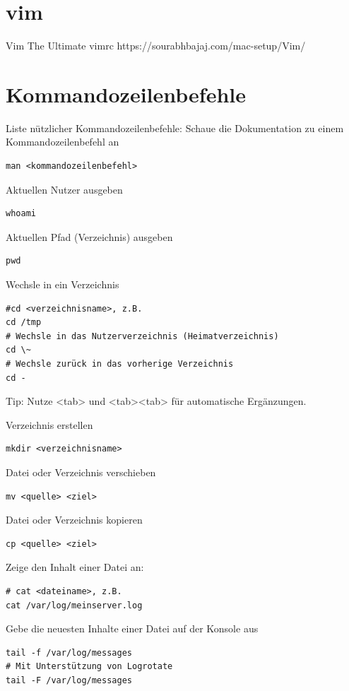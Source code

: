 \documentclass[]{article}
\begin{document}
\section{vim}
Vim
The Ultimate vimrc
https://sourabhbajaj.com/mac-setup/Vim/
\section{Kommandozeilenbefehle}
Liste nützlicher Kommandozeilenbefehle:
Schaue die Dokumentation zu einem Kommandozeilenbefehl an
\begin{verbatim}
man <kommandozeilenbefehl>
\end{verbatim}

Aktuellen Nutzer ausgeben
\begin{verbatim}
whoami
\end{verbatim}

Aktuellen Pfad (Verzeichnis) ausgeben
\begin{verbatim}
pwd
\end{verbatim}

Wechsle in ein Verzeichnis
\begin{verbatim}
#cd <verzeichnisname>, z.B.
cd /tmp
# Wechsle in das Nutzerverzeichnis (Heimatverzeichnis)
cd \~
# Wechsle zurück in das vorherige Verzeichnis
cd -
\end{verbatim}

Tip: Nutze <tab> und <tab><tab> für automatische Ergänzungen.

Verzeichnis erstellen
\begin{verbatim}
mkdir <verzeichnisname>
\end{verbatim}

Datei oder Verzeichnis verschieben
\begin{verbatim}
mv <quelle> <ziel>
\end{verbatim}

Datei oder Verzeichnis kopieren
\begin{verbatim}
cp <quelle> <ziel>
\end{verbatim}

Zeige den Inhalt einer Datei an:
\begin{verbatim}
# cat <dateiname>, z.B.
cat /var/log/meinserver.log
\end{verbatim}

Gebe die neuesten Inhalte einer Datei auf der Konsole aus
\begin{verbatim}
tail -f /var/log/messages
# Mit Unterstützung von Logrotate
tail -F /var/log/messages
\end{verbatim}
\end{document}
